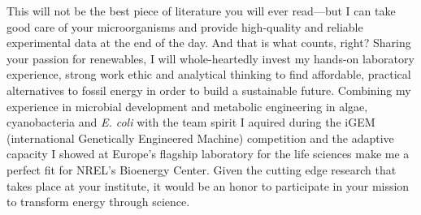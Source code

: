 \documentclass[11pt,a4paper,sans]{moderncv}
\date{\today}
\begin{document}
     
\makelettertitle
\begin{spacing}{1.15}
        
This will not be the best piece of literature you will ever read---but I can take good care of your microorganisms and provide high-quality and reliable experimental data at the end of the day. And that is what counts, right? Sharing your passion for renewables, I will whole-heartedly invest my hands-on laboratory experience, strong work ethic and analytical thinking to find affordable, practical alternatives to fossil energy in order to build a sustainable future.
Combining my experience in microbial development and metabolic engineering in algae, cyanobacteria and \textit{E. coli} with the team spirit I aquired during the iGEM (international Genetically Engineered Machine) competition and the adaptive capacity I showed at Europe's flagship laboratory for the life sciences make me a perfect fit for NREL's Bioenergy Center.
Given the cutting edge research that takes place at your institute, it would be an honor to participate in your mission to transform energy through science.%
\par\vspace*{1mm} %


\end{spacing}
\end{document}
